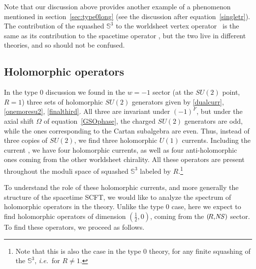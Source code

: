 \documentclass[12pt]{article}
\def\ie{{i.e.}}
\def\NS{{\it \!NS}}
\def\half{\frac12}
\def\coeff#1#2{{\textstyle \frac{#1}{#2}}}
\def\hf{\coeff12}
\newcommand{\bS}{{\mathbb S}}
\numberwithin{equation}{section}
\def\ie{{\it i.e.}}
\def\coeff#1#2{{\textstyle{\frac{#1}{ #2}}}}
\def\half{\frac12}
\def\hf{{\textstyle\half}}
\def\ie{{\it i.e.}}
\begin{document}
Note that our discussion above provides another example of a phenomenon mentioned in section~\ref{sec:type0long} (see the discussion after equation~\eqref{singletr}). The contribution of the squashed $\bS^3$ to the worldsheet vertex operator \blocktach\ is the same as its contribution to the spacetime operator \blocktachST, but the two live in different theories, and so should not be confused. 



\subsection{Holomorphic operators}
\label{sec:holo ops}


In the type 0 discussion we found in the $w=-1$ sector (at the $SU(2)$ point, $R=1$) three sets of holomorphic $SU(2)$ generators given by \eqref{dualcurr}, \eqref{onemoresu2}, \eqref{finalthird}. All three are invariant under $(-1)^F$, but under the axial shift $\Omega$ of equation~\eqref{GSOphase}, the charged $SU(2)$ generators are odd, while the ones corresponding to the Cartan subalgebra are even. Thus, instead of three copies of $SU(2)$, we find three holomorphic $U(1)$ currents. Including the current \dualbbzero, we have four holomorphic currents, as well as four anti-holomorphic ones coming from the other worldsheet chirality. All these operators are present throughout the moduli space of squashed $\bS^3$ labeled by $R$.\footnote{Note that this is also the case in the type 0 theory, for any finite squashing of the $\bS^3$, \ie\ for $R\not=1$.}

To understand the role of these holomorphic currents, and more generally the structure of the spacetime SCFT, we would like to analyze the spectrum of holomorphic operators in the theory. Unlike the type 0 case, here we expect to find holomorphic operators of dimension $(\hf,0)$, coming from the $(\!R,\NS)$ sector. To find these operators, we proceed as follows. 
\end{document}
